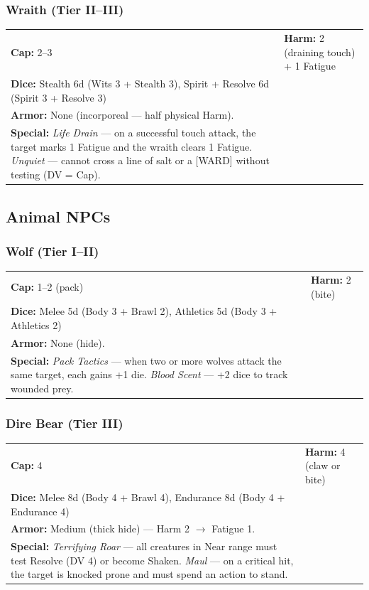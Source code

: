 \subsubsection{Wraith (Tier II--III)}
\vspace{0.2em}
\begin{tabular}{@{}ll@{}}
\textbf{Cap:} 2--3 & \textbf{Harm:} 2 (draining touch) + 1 Fatigue \\
\textbf{Dice:} Stealth 6d (Wits 3 + Stealth 3), Spirit + Resolve 6d (Spirit 3 + Resolve 3) \\
\textbf{Armor:} None (incorporeal --- half physical Harm). \\
\textbf{Special:} \textit{Life Drain} --- on a successful touch attack, the target marks 1 Fatigue and the wraith clears 1 Fatigue. \textit{Unquiet} --- cannot cross a line of salt or a [WARD] without testing (DV = Cap).
\end{tabular}

\subsection{Animal NPCs}

\subsubsection{ Wolf (Tier I--II)}
\vspace{0.2em}
\begin{tabular}{@{}ll@{}}
\textbf{Cap:} 1--2 (pack) & \textbf{Harm:} 2 (bite) \\
\textbf{Dice:} Melee 5d (Body 3 + Brawl 2), Athletics 5d (Body 3 + Athletics 2) \\
\textbf{Armor:} None (hide). \\
\textbf{Special:} \textit{Pack Tactics} --- when two or more wolves attack the same target, each gains +1 die. \textit{Blood Scent} --- +2 dice to track wounded prey.
\end{tabular}

\subsubsection{Dire Bear (Tier III)}
\vspace{0.2em}
\begin{tabular}{@{}ll@{}}
\textbf{Cap:} 4 & \textbf{Harm:} 4 (claw or bite) \\
\textbf{Dice:} Melee 8d (Body 4 + Brawl 4), Endurance 8d (Body 4 + Endurance 4) \\
\textbf{Armor:} Medium (thick hide) --- Harm 2 $\rightarrow$ Fatigue 1. \\
\textbf{Special:} \textit{Terrifying Roar} --- all creatures in Near range must test Resolve (DV 4) or become Shaken. \textit{Maul} --- on a critical hit, the target is knocked prone and must spend an action to stand.
\end{tabular}

